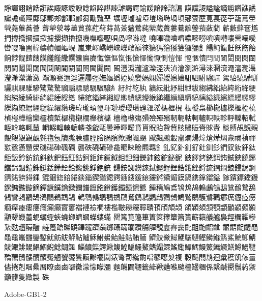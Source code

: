 諍諢詡誚誥誑誒諏諑諉諛諗諂誶諶諫謔謁諤諭諼諳諦諮諞
謨讜謖謚謐謫謭譖譙譎讞譫讖陘鄺鄔鄴郟鄶鄆酈芻勱巰堊
壙壢壠壚埡塏堖塒堝塤薌蕓藶莧萇蓯苧蘢蔦塋煢蕘蓽蕎薈
薺犖滎蕁藎蕒蓀葒葤蒔萵薟蕕鶯蒓縈蕆蕢蔞驀蘺鎣蕷蘞藺
蘄藪蘚奩尷捫摶撟摑摜撳攄攖擷擼攛嘰嘸囈嚦唄咼嚀噝噠
嘵嗶噦噲嚌噥嘜嘮嗩嘖囀嘍嚳囁噯轡嚶嚕圇幃幬幘幗嶇峴
嵐崬嶧嶠嶗崍嶸嶁巔徠獷獁獪猻獫玀獼飠餳飩餼飪飫飭飴
餉餑餛餷餿饃饈饉饊饌饢廡賡懺憮慪愾悵愴懌慟懨惻愷惲
慳愜憒閂閆闈閎閔閌闥閭閫鬮閬閾閶鬩閿閽閼闃闋闔闐闕
闞灃潙瀧瀘濼涇浹湞澮瀏滸潯淶潿瀆澠瀋灧灄瀅潷瀠瀟瀲
瀨灝騫邇逕邐屨弳嫵嫗嬀婭嬈孌媧嫻嬋嬡嬪嬙駔駟駙騶驛
駑駘驍驊駢驪騏騍騅驂騭騖驁騮騸驃驄驏驥驤糹紆紂紇紈
纊紜紕紓紺紲紱縐紼絀紿絝絎絳綆綃綈綾綺緋緔緄綞綬綹
綣綰緇緙緗緹緲繢緦緶緱縋緡縉縝縟縞縭縊縑繽縹縵縲繆
繅纈繚繒繮繾繰繯纘璣瑋瓏頊璽琿璉璦瓔瓚韙韞韜榪櫪梘
棖樅梟櫛櫳櫨櫟檉椏橈楨榿樺檜欒欞櫝槧欏欖櫬櫚櫸檳櫧
檣櫓櫞殤殞殮殫殯軔軛軲軻轤軹軼軫軤轢軺軾輊輇輅輒輦
輞輟輜輳轆轔戔戧甌曇曄暉曖賁貰貺貽贄貲賅贐賑賚賕賫
賧賻覘覬覡覿覦覯覲覷毿氌氬牘朧腖臚脛膾腡臏歟颮颯颶
颼飆飈轂齏斕煬煒熗燁燜燾禰禎禪懟慤懣戇澩磯碭硨碸礪
礱硤磽磧磣龕瞘睞瞼羆羈釒釓釔釙釗釕釷釧釤鍆釵釹鈈鈦
鉅鈑鈐鈁鈧鈄鈥鈀鈺鉦鈷鈳鉕鈽鈸鉞鉬鉭鈿鑠鈰鉉鉈鉍鈮
鈹鐸銬銠鉺銪鋮鋏鐃鋣鐺銱銦鎧銖鋌銩鏵銓鉿鎩銚錚銫銃
鐋銨銣鐒錸鋱鏗鋥鋰鋯鋨銼鋝鋶鐦鐧鋃鋟鋦錒錆鍩錛鍀錁
錕錮鍃錇錈錟錙鍥鍇鍶鍔鍤鎪鍰鎄鏤鏘鐨鎇鏌鎘鎸鎿鎦鎰
鎵鑌鏢鏜鏝鏍鏞鏃鏇鏑鐔鐝鏷鑥鐓鑭鐠鑹鏹鐙鑊鐲鐿鑔鑣
鍾穡鳩鳶鴇鴆鴣鶇鸕鴝鴟鷥鴯鷙鴰鵂鸞鵓鸝鵠鵒鷳鵜鵡鶓
鵪鵯鶉鶘鶚鷀鶥鶩鷂鶼鸚鷓鷚鷯鷦鷲鷸鸌鷺鸛癤癘癧瘂癆
癇癉瘞瘻癭癮癩癲竇窶襠褳襝襇褸襤皸耮耬聹聵頇頎頏頡
頜潁頦頷顎顓顳顢顙顥顬顰蟣蠆蜆蠣蟶蛺蟯螄蠐蟈蠑螻蟎
罌篤筧籩篳簀篋籜簞簫簣籪籟艤艫裊羥糲糶糝縶麩趲釅釃
鹺躉蹌躒蹺蹕躚躋躓躑躡蹣躪躦觴觶靚靂霽靄齔齟齙齠齜
齦齬齪齷⿌黽黿鼉讎鑾鏨魷魴鮁鮃鮎鱸穌鮒鱟鮐鮭鮚鮪鮞
鱭鮫鮝鱘鯁鱺鰱鰹鰣鰷鯀鯊鯇鯽鯖鯪鯫鯡鯤鯧鯝鯢鯰鯛鯴
鯔鱝鰈鰐鰍鰒鰉鯿鰠鰲鰭鰨鰥鰩鰳鰾鱈鰻鰵鱅鱖鱔鱒鱧韃
鞽韉鶻髏髖髕魘魎饗饜鬢黷黲襬闆錶彆蔔纔齣噹鼕噁髮複
穀颳閤鬍迴彙穫飢傢薑儘捲剋睏纍曆瞭⿄鹵囉黴濛懞矇瀰
麵衊闢韆籤縴鞦麯囌颱檯罎糰係繫鹹嚮鬚葯禦籲髒隻緻製
硃

Adobe-GB1-2

